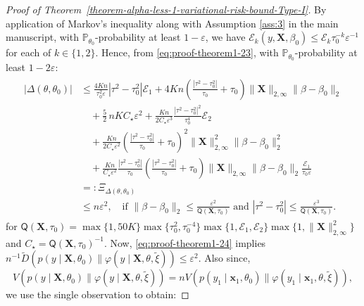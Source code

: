 \documentclass[12pt]{article}
\numberwithin{equation}{section}
\begin{document}
\begin{proof}[Proof of Theorem~\ref{theorem-alpha-less-1-variational-risk-bound-Type-I}]
By application of Markov's inequality along with Assumption \ref{ass:3} in the main manuscript, with $\mathbb{P}_{\theta_0}$-probability at least $1-\varepsilon$, we have $\mathcal{E}_{k}(y, \mathbf{X}, \beta_0) \leq \mathscr{E}_k \tau_0^{-k}\varepsilon^{-1}$ for each of $k \in \{1,2\}$. Hence, from \eqref{eq:proof-theorem1-23}, with $\mathbb{P}_{\theta_0}$-probability at least $1-2\varepsilon$:
%
\begin{align}\label{eq:proof-theorem1-24}
\begin{split}
|\Delta(\theta, \theta_0)|
&\leq \frac{4Kn}{\tau_0^2\varepsilon}|\tau^2-\tau_0^2|\mathscr{E}_1
+ 4Kn\left(\frac{|\tau^2-\tau_0^2|}{\tau_0} + \tau_0\right)
\lVert \mathbf{X}\rVert_{2,\infty}\lVert \beta-\beta_0\rVert_2
\\
&\quad + \frac{5}{2}\,nK  C_{\star}\varepsilon^2
+ \frac{Kn}{2 C_{\star}\varepsilon^3}\frac{|\tau^2-\tau_0^2|^2}{\tau_0^4}\mathscr{E}_2
\\
&\quad + \frac{Kn}{2 C_{\star}\varepsilon^2}
\left(\frac{|\tau^2-\tau_0^2|}{\tau_0}+\tau_0\right)^2
\lVert \mathbf{X}\rVert_{2,\infty}^2 \lVert \beta-\beta_0\rVert_2^2
\\
&\quad + \frac{Kn}{C_{\star} \varepsilon^2}
\frac{|\tau^2-\tau_0^2|}{\tau_0}
\left(\frac{|\tau^2-\tau_0^2|}{\tau_0}+\tau_0\right)
\lVert \mathbf{X}\rVert_{2,\infty}\lVert \beta-\beta_0\rVert_2
\frac{\mathscr{E}_1}{\tau_0 \varepsilon}
\\
&=: \Xi_{\Delta(\theta, \theta_0)}
\\
&\leq n\varepsilon^2,\quad \text{if }
\lVert \beta-\beta_0\rVert_2 \leq \frac{\varepsilon^2}{\mathsf{Q}(\mathbf{X}, \tau_0)}
\text{ and }
|\tau^2 - \tau_0^2| \leq \frac{\varepsilon^3}{\mathsf{Q}(\mathbf{X}, \tau_0)}.
\end{split}
\end{align}
%
for $\mathsf{Q}(\mathbf{X}, \tau_0) = \max\{1, 50K\}\max\{\tau_0^2, \tau_0^{-4}\}\max\{1, \mathscr{E}_1, \mathscr{E}_2\}\max\{1, \lVert \mathbf X \rVert_{2, \infty}^2\}$ and $C_{\star} = \mathsf{Q}(\mathbf{X}, \tau_0)^{-1}$.
Now, \eqref{eq:proof-theorem1-24} implies $n^{-1}\tilde{D}\left(p(y\mid \mathbf{X}, \theta_0) \parallel \varphi(y\mid \mathbf{X}, \theta, \tilde{\xi})\right) \leq \varepsilon^2$. Also since, $$V\left(p(y\mid \mathbf{X}, \theta_0) \parallel \varphi(y\mid \mathbf{X}, \theta, \tilde{\xi})\right) = nV\left(p(y_1\mid \mathbf{x}_1, \theta_0) \parallel \varphi(y_1\mid \mathbf{x}_1, \theta, \tilde{\xi})\right),$$ we use the single observation to obtain:

\end{proof}
\end{document}
